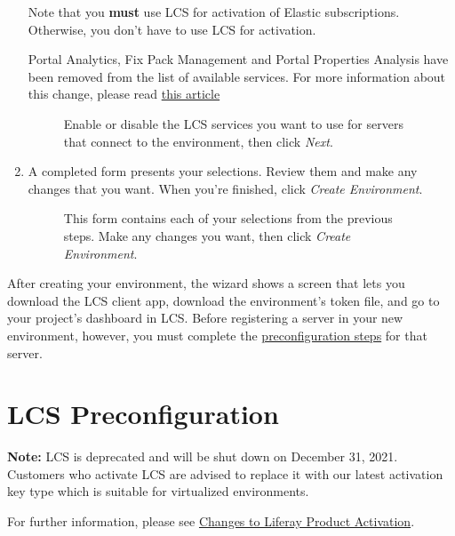 \begin{enumerate}
  Note that you \textbf{must} use LCS for activation of Elastic
  subscriptions. Otherwise, you don't have to use LCS for activation.

  Portal Analytics, Fix Pack Management and Portal Properties Analysis
  have been removed from the list of available services. For more
  information about this change, please read
  \href{https://help.liferay.com/hc/en-us/articles/360037317691-Liferay-Connected-Services-Feature-Deprecation-Update-March-2020}{this
  article}

  \begin{figure}
  \centering
  \caption{Enable or disable the LCS services you want to use for
  servers that connect to the environment, then click \emph{Next}.}
  \end{figure}
\item
  A completed form presents your selections. Review them and make any
  changes that you want. When you're finished, click \emph{Create
  Environment}.

  \begin{figure}
  \centering
  \caption{This form contains each of your selections from the previous
  steps. Make any changes you want, then click \emph{Create
  Environment}.}
  \end{figure}
\end{enumerate}

After creating your environment, the wizard shows a screen that lets you
download the LCS client app, download the environment's token file, and
go to your project's dashboard in LCS. Before registering a server in
your new environment, however, you must complete the
\href{/docs/7-2/deploy/-/knowledge_base/d/lcs-preconfiguration}{preconfiguration
steps} for that server.

\chapter{LCS Preconfiguration}\label{lcs-preconfiguration}

\noindent\hrulefill

\textbf{Note:} LCS is deprecated and will be shut down on December 31,
2021. Customers who activate LCS are advised to replace it with our
latest activation key type which is suitable for virtualized
environments.

For further information, please see
\href{https://help.liferay.com/hc/en-us/articles/4402347960845-Changes-to-Liferay-Product-Activation}{Changes
to Liferay Product Activation}.


